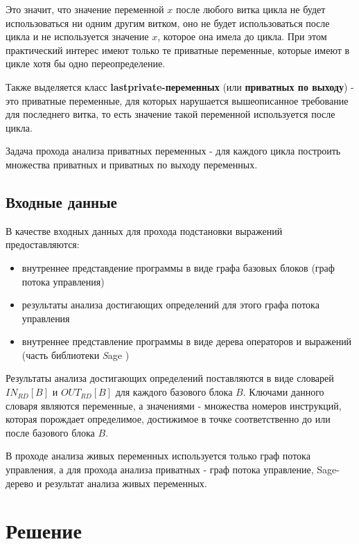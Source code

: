 \documentclass{article}
\begin{document}
Это значит, что значение переменной $x$ после любого витка цикла не будет использоваться ни одним другим витком, оно не будет использоваться после цикла и не используется значение $x$, которое она имела до цикла. При этом практический интерес имеют только те приватные переменные, которые имеют в цикле хотя бы одно переопределение.

\begin{defenition}
Также выделяется класс \textbf{lastprivate-переменных} (или \textbf{приватных по выходу}) - это приватные переменные, для которых нарушается вышеописанное требование для последнего витка, то есть значение такой переменной используется после цикла.
\end{defenition}

Задача прохода анализа приватных переменных - для каждого цикла построить множества приватных и приватных по выходу переменных.

\subsection{Входные данные}

В качестве входных данных для прохода подстановки выражений предоставляются:
\begin{itemize}
    \item внутреннее представдение программы в виде графа базовых блоков (граф потока управления)
    \item результаты анализа достигающих определений для этого графа потока управления
    \item внутреннее представление программы в виде дерева операторов и выражений (часть библиотеки \textit Sage \cite{sage})
\end{itemize}


Результаты анализа достигающих определений поставляются в виде словарей $IN_{RD}[B]$ и $OUT_{RD}[B]$ для каждого базового блока $B$.
Ключами данного словаря являются переменные, а значениями - множества номеров инструкций, которая порождает определимое, 
достижимое в точке соответственно до или после базового блока $B$.


В проходе анализа живых переменных используется только граф потока управления, а для прохода анализа приватных - 
граф потока управление, Sage-дерево \cite{sage} и результат анализа живых переменных.

\section{Решение}
\end{document}
